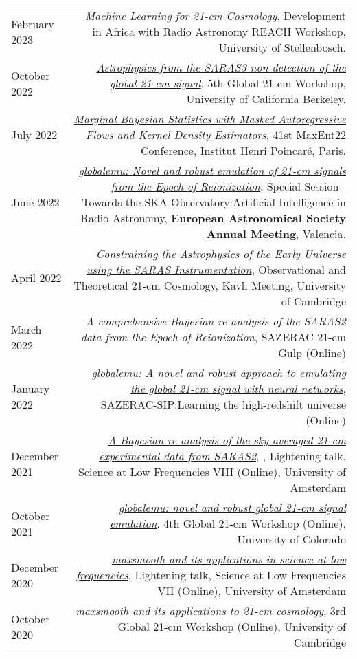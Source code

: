 \documentclass{article}
\begin{document}
\begin{tabular}{L!{\vrule}R}
    February 2023 & \href{https://github.com/htjb/Talks/blob/master/Talks/DARA_REACH_Workshop/DARA_Workshop.pdf}{\textit{Machine Learning for 21-cm Cosmology}}, Development in Africa with Radio Astronomy REACH Workshop, University of Stellenbosch. \\
    October 2022 & \href{https://global21cmworkshop.org/2022-berkeley/}{\textit{Astrophysics from the SARAS3 non-detection of the global 21-cm signal}}, 5th Global 21-cm Workshop, University of California Berkeley. \\
	July 2022 & \href{https://github.com/htjb/Talks/blob/master/Talks/MaxEnt22_margarine_June_2022/MaxEnt_slides.pdf}{\textit{Marginal Bayesian Statistics with Masked Autoregressive Flows and Kernel Density Estimators}}, 41st MaxEnt22 Conference, Institut Henri Poincar\'e, Paris. \\
	June 2022 & \href{https://github.com/htjb/Talks/blob/master/Talks/ESA_globalemu_July_2022/AUDITORIUM\%203A_SS23a_0940_Bevins.pdf}{\textit{globalemu: Novel and robust emulation of 21-cm signals from the Epoch of Reionization}}, Special Session - Towards the SKA Observatory:Artificial Intelligence in Radio Astronomy, \textbf{European Astronomical Society Annual Meeting}, Valencia. \\
	April 2022 & \href{https://www.kicc.cam.ac.uk/events/kavli-science-themed-meetings/observational-and-theoretical-21-cm-cosmology}{\textit{Constraining the Astrophysics of the Early Universe using the SARAS Instrumentation}}, Observational and Theoretical 21-cm Cosmology, Kavli Meeting, University of Cambridge \\
	March 2022 & \textit{A comprehensive Bayesian re-analysis of the SARAS2 data from the Epoch of Reionization}, SAZERAC 21-cm Gulp (Online) \\
	January 2022 & \href{https://www.youtube.com/watch?v=BFwia93NuAc&list=PLp95u5tgS_YUkFaLATBQpLajJzO5ljN5u&index=5}{\textit{globalemu: A novel and robust approach to emulating the global 21-cm signal with neural networks}}, SAZERAC-SIP:Learning the high-redshift universe (Online) \\
	December 2021 & \href{https://www.youtube.com/watch?v=93KCp7rHcGA&list=PLZL7YmXBBHPDCyNfJcWwP78GgacY_Og4E&index=23}{\textit{A Bayesian re-analysis of the sky-averaged 21-cm experimental data from SARAS2}}, , Lightening talk, Science at Low Frequencies VIII (Online), University of Amsterdam \\
	October 2021 & \href{https://www.youtube.com/watch?v=862NuVyF33k&list=PLF7c7ri2hrnGlwbn4JLc0PWbncSeARdTP&index=4}{\textit{globalemu: novel and robust global 21-cm signal emulation}}, 4th Global 21-cm Workshop (Online), University of Colorado \\
	December 2020 & \href{https://www.youtube.com/watch?v=Yw6_IInwTNE}{\textit{maxsmooth and its applications in science at low frequencies}}, Lightening talk, Science at Low Frequencies VII (Online), University of Amsterdam \\
	October 2020 & \textit{maxsmooth and its applications to 21-cm cosmology}, 3rd Global 21-cm Workshop (Online), University of Cambridge \\
\end{tabular}
\end{document}
